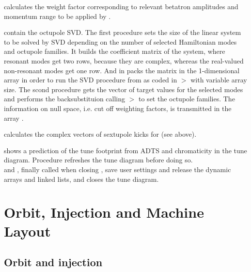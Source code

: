 \documentclass[12pt]{article}
\newcommand\code[1]{{\tt #1}}
\newcommand{\unico}[1]{{\color{burntorange}\code{#1}}}
\newcommand{\prcod}[2]{\opauni{#1}$>$\unico{#2}}
\newcommand{\opagui}[1]{\colorbox{blue!20}{{\color{black}\code{#1}}}}
\newcommand{\oguih}[2]{\subsection{\label{#2}#1}{\Huge\opagui{#2}}\\}
\newcommand{\ogui}[1]{\hyperref[#1]{\opagui{#1}}}
\newcommand{\opauni}[1]{\colorbox{orange!30}{{\color{black}\code{#1}}}}
\newcommand{\ouni}[1]{\hyperref[#1]{\opauni{#1}}}
\begin{document}
{\unico{HamScaling} calculates the weight factor corresponding to relevant betatron amplitudes and momentum range to be applied by \unico{Penalty}.

\unico{Oct\_sv(dcmp,bskb)} contain the octupole SVD. The first procedure sets the size of the linear system to be solved by SVD depending on the number of selected Hamiltonian modes and octupole families. It builds the coefficient matrix of the system, where resonant modes get two rows, because they are complex, whereas the real-valued non-resonant modes get one row. And in packs the matrix in the 1-dimensional array \unico{osvd\_aupack} in order to run the SVD procedure from \cite{numrec} as coded in \prcod{mathlib}{SVDCMP} with variable array size. The scond procedure gets the vector of target values for the selected modes and performs the backsubstituion calling \prcod{mathlib}{SVBKSB} to set the octupole families. The information on null space, i.e. cut off weighting factors, is transmitted in the array \unico{osvd\_wuse}.

\unico{getSVector} calculates the complex vectors of sextupole kicks for \ogui{ochromsvector} (see above).

\unico{TDiagPlot} shows a prediction of the tune footprint from ADTS and chromaticity in the tune diagram. Procedure \unico{TDiagPlotFull} refreshes the tune diagram before doing so.\\[1ex]


\unico{ChromSaveDef} and \unico{ChromDispose}, finally called when closing \ouni{opachroma}, save user settings and release the dynamic arrays and linked lists, and \unico{CloseTuneDiagram} closes the tune diagram.
}



\section{\label{secorin}Orbit, Injection and Machine Layout}

\oguih{Orbit and injection}{opaorbit} 
\end{document}
